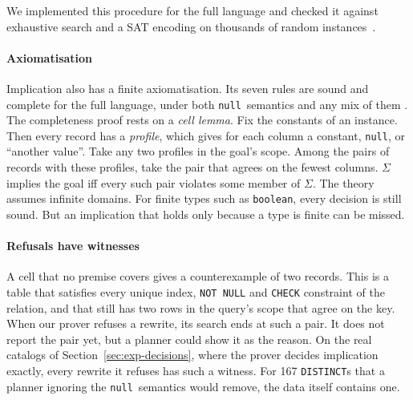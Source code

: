 \documentclass[conference]{IEEEtran}
\theoremstyle{definition}
\newcommand{\sql}[1]{\texttt{#1}}
\newcommand{\nul}{\texttt{null}}
\newcommand{\Sig}{\Sigma}
\newif\ifextended
\begin{document}
\ifextended
We implemented this procedure for the full language. It agrees with exhaustive search over all pairs on 3{,}000 random
instances with \sql{IN}, \sql{NOT IN}, both semantics and up to two templates per condition. It also agrees with a SAT
encoding of the existence of a violating pair on 3{,}000 instances without ${\notin}$. Under the side conditions of
Theorem~\ref{thm:pos}, no column had two maximal states in 10{,}640 random instances. We checked
Theorems~\ref{thm:pos}--\ref{thm:neq} against SAT on 40{,}000 random instances, and the reductions on 700 random 3-CNFs.

\else
We implemented this procedure for the full language and checked it against exhaustive search and a SAT encoding on
thousands of random instances~\cite{EXT}.

\fi
\paragraph*{Axiomatisation} Implication also has a finite axiomatisation. Its seven rules are sound and complete
for the full language, under both \nul\ semantics and any mix of them \ifextended(Appendix~\ref{app:axiom})\else\cite{EXT}\fi.
The completeness proof rests on a \emph{cell lemma}. Fix the constants of an instance. Then every record has a \emph{profile}, which gives for each column a constant, \nul, or ``another value''. Take any two
profiles in the goal's scope. Among the pairs of records with these profiles, take the pair that agrees on the
fewest columns. $\Sig$ implies the goal iff every such pair violates some member of $\Sig$. The theory assumes infinite domains. For finite types such as
\sql{boolean}, every decision is still sound. But an implication that holds only because a type is finite can be missed.

\paragraph*{Refusals have witnesses} A cell that no premise covers gives a counterexample of two records. This is a
table that satisfies every unique index, \sql{NOT NULL} and \sql{CHECK} constraint of the relation, and that still has
two rows in the query's scope that agree on the key. When our prover refuses a rewrite, its search ends at such a pair.
It does not report the pair yet, but a planner could show it as the reason. On the real catalogs of
Section~\ref{sec:exp-decisions}, where the prover decides implication exactly, every rewrite it refuses has such a
witness. For 167 \sql{DISTINCT}s that a planner ignoring the \nul\ semantics would remove, the data itself contains one.
\end{document}
